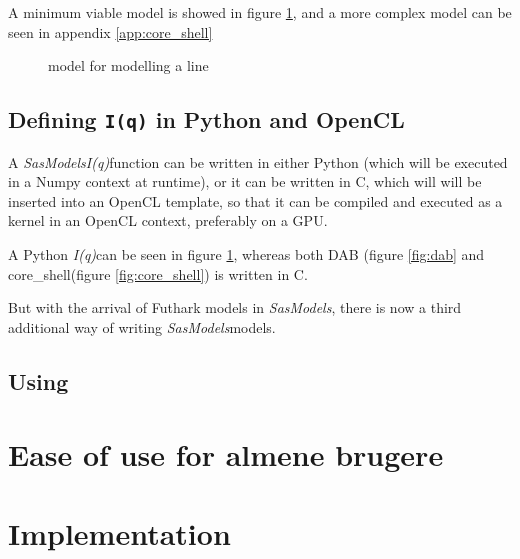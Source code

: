 \documentclass[11pt]{article}
\newcommand{\sasmodels}{\textit{SasModels}}
\newcommand{\iq}{\textit{I(q)}}
\begin{document}
A minimum viable model is showed in figure \ref{fig:linemodel}, and a more
complex model can be seen in appendix \ref{app:core_shell}

\begin{figure}
  \caption{model for modelling a line}\label{fig:linemodel}
\end{figure}

\subsection{Defining \texttt{I(q)} in Python and OpenCL}
A \sasmodels \iq function can be written in either Python (which will be
executed in a Numpy context at runtime), or it can be written in C, which will
will be inserted into an OpenCL template, so that it can be compiled and 
executed as a kernel in an OpenCL context, preferably on a GPU.

A Python \iq can be seen in figure \ref{fig:linemodel}, whereas both DAB (figure
\ref{fig:dab} and core_shell(figure \ref{fig:core_shell}) is written in C.

But with the arrival of Futhark models in \sasmodels, there is now a third
additional way of writing \sasmodels models.














\subsection{Using }






\section{Ease of use for almene brugere}

\section{Implementation}
\end{document}
